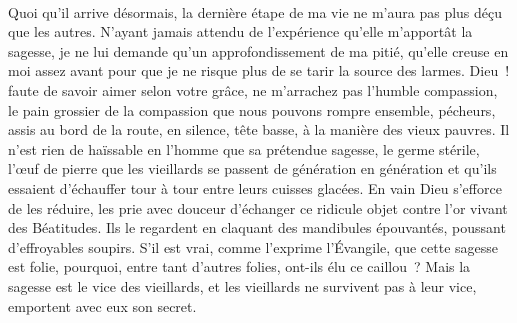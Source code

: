 \documentclass[french,twoside]{book} %
\newcommand{\astertri}{\medskip\par\centerline{\color{rubric}\large\selectfont{\syms ✻\,✻\,✻}}\medskip\par}%
\begin{document}
\noindent  \par
Quoi qu’il arrive désormais, la dernière étape de ma vie ne m’aura pas plus déçu que les autres. N’ayant jamais attendu de l’expérience qu’elle m’apportât la sagesse, je ne lui demande qu’un approfondissement de ma pitié, qu’elle creuse en moi assez avant pour que je ne risque plus de se tarir la source des larmes. Dieu ! faute de savoir aimer selon votre grâce, ne m’arrachez pas l’humble compassion, le pain grossier de la compassion que nous pouvons rompre ensemble, pécheurs, assis au bord de la route, en silence, tête basse, à la manière des vieux pauvres. Il n’est rien de haïssable en l’homme que sa prétendue sagesse, le germe stérile, l’œuf de pierre que les vieillards se passent de génération en génération et qu’ils essaient d’échauffer tour à tour entre leurs cuisses glacées. En vain Dieu s’efforce de les réduire, les prie avec douceur d’échanger ce ridicule objet contre l’or vivant des Béatitudes. Ils le regardent en claquant des mandibules épouvantés, poussant d’effroyables soupirs. S’il est vrai, comme l’exprime l’Évangile, que cette sagesse est folie, pourquoi, entre tant d’autres folies, ont-ils élu ce caillou ? Mais la sagesse est le vice des vieillards, et les vieillards ne survivent pas à leur vice, emportent avec eux son secret.\par
 \par

\astertri
\end{document}
